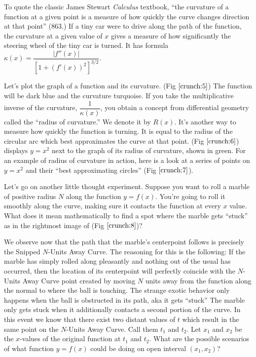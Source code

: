 To quote the classic James Stewart \textit{Calculus} textbook, ``the curvature of a function at a given point is a measure of how quickly the curve changes direction at that point'' (863.) If a tiny car were to drive along the path of the function, the curvature at a given value of $x$ gives a measure of how significantly the steering wheel of the tiny car is turned. It has formula $\kappa (x) = \dfrac{|f''(x)|}{[1 + (f'(x))^2]^{3/2}}$.

\figuresI

Let’s plot the graph of a function and its curvature. (Fig $\ref{crunch:5}$) The function will be dark blue and the curvature turquoise. If you take the multiplicative inverse of the curvature, $\dfrac{1}{\kappa (x)}$, you obtain a concept from differential geometry called the ``radius of curvature.'' We denote it by $R(x)$. It’s another way to measure how quickly the function is turning. It is equal to the radius of the circular arc which best approximates the curve at that point. (Fig $\ref{crunch:6}$) displays $y = x^2$ next to the graph of its radius of curvature, shown in green. For an example of radius of curvature in action, here is a look at a series of points on $y = x^2$ and their ``best approximating circles'' (Fig $\ref{crunch:7}$).

Let’s go on another little thought experiment. Suppose you want to roll a marble of positive radius $N$ along the function $y = f(x)$. You’re going to roll it smoothly along the curve, making sure it contacts the function at every $x$ value. What does it mean mathematically to find a spot where the marble gets ``stuck'' as in the rightmost image of (Fig $\ref{crunch:8}$)?

\figuresII

We observe now that the path that the marble’s centerpoint follows is precisely the Snipped $N$-Units Away Curve. The reasoning for this is the following: If the marble has simply rolled along pleasantly and nothing out of the usual has occurred, then the location of its centerpoint will perfectly coincide with the $N$-Units Away Curve point created by moving $N$ units away from the function along the normal to where the ball is touching. The strange exotic behavior only happens when the ball is obstructed in its path, aka it gets ``stuck'' The marble only gets stuck when it additionally contacts a second portion of the curve. In this event we know that there exist two distant values of $t$ which result in the same point on the $N$-Units Away Curve. Call them $t_1$ and $t_2$. Let $x_1$ and $x_2$ be the $x$-values of the original function at $t_1$ and $t_2$. What are the possible scenarios of what function $y = f(x)$ could be doing on open interval $(x_1, x_2)$?

